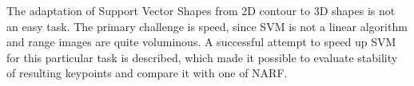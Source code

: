 The adaptation of Support Vector Shapes from 2D contour to 3D shapes is not an easy task. The primary challenge is speed, since   
SVM is not a linear algorithm and range images are quite voluminous. A successful attempt to speed up SVM for this particular  task is described, which made it possible to evaluate stability of resulting keypoints and compare it with one of NARF.
